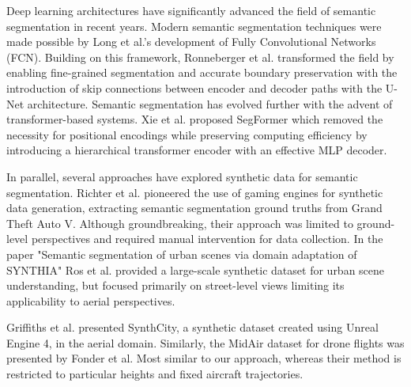 \documentclass[../report.tex]{subfiles}
\begin{document}

    Deep learning architectures have significantly advanced the field of semantic segmentation in recent years. Modern semantic segmentation techniques were made possible by Long et al.'s \cite{long2015fully} development of Fully Convolutional Networks (FCN). Building on this framework, Ronneberger et al. \cite{ronneberger2015u} transformed the field by enabling fine-grained segmentation and accurate boundary preservation with the introduction of skip connections between encoder and decoder paths with the U-Net architecture. Semantic segmentation has evolved further with the advent of transformer-based systems. Xie et al. \cite{xie2021segformer} proposed SegFormer which removed the necessity for positional encodings while preserving computing efficiency by introducing a hierarchical transformer encoder with an effective MLP decoder. 

    In parallel, several approaches have explored synthetic data for semantic segmentation. Richter et al. \cite{richter2016playing} pioneered the use of gaming engines for synthetic data generation, extracting semantic segmentation ground truths from Grand Theft Auto V. Although groundbreaking, their approach was limited to ground-level perspectives and required manual intervention for data collection. In the paper "Semantic segmentation of urban scenes via domain adaptation of SYNTHIA" \cite{ros2017semantic} Ros et al. provided a large-scale synthetic dataset for urban scene understanding, but focused primarily on street-level views limiting its applicability to aerial perspectives.
    
    Griffiths et al. \cite{griffiths2019synthcity} presented SynthCity, a synthetic dataset created using Unreal Engine 4, in the aerial domain. Similarly, the MidAir \cite{fonder2019mid} dataset for drone flights was presented by Fonder et al. Most similar to our approach, whereas their method is restricted to particular heights and fixed aircraft trajectories.
\end{document}
